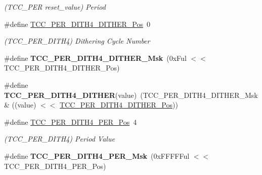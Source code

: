 \begin{DoxyCompactItemize}
\begin{DoxyCompactList}\small\item\em (T\+C\+C\+\_\+\+P\+E\+R reset\+\_\+value) Period \end{DoxyCompactList}\item 
\hypertarget{group___s_a_m_l21___t_c_c_ga9c229609a7a06a64228b8e317d126b72}{}\#define \hyperlink{group___s_a_m_l21___t_c_c_ga9c229609a7a06a64228b8e317d126b72}{T\+C\+C\+\_\+\+P\+E\+R\+\_\+\+D\+I\+T\+H4\+\_\+\+D\+I\+T\+H\+E\+R\+\_\+\+Pos}~0\label{group___s_a_m_l21___t_c_c_ga9c229609a7a06a64228b8e317d126b72}

\begin{DoxyCompactList}\small\item\em (T\+C\+C\+\_\+\+P\+E\+R\+\_\+\+D\+I\+T\+H4) Dithering Cycle Number \end{DoxyCompactList}\item 
\hypertarget{group___s_a_m_l21___t_c_c_gae3246669a1f05e63ea350d9879012d2a}{}\#define {\bfseries T\+C\+C\+\_\+\+P\+E\+R\+\_\+\+D\+I\+T\+H4\+\_\+\+D\+I\+T\+H\+E\+R\+\_\+\+Msk}~(0x\+Ful $<$$<$ T\+C\+C\+\_\+\+P\+E\+R\+\_\+\+D\+I\+T\+H4\+\_\+\+D\+I\+T\+H\+E\+R\+\_\+\+Pos)\label{group___s_a_m_l21___t_c_c_gae3246669a1f05e63ea350d9879012d2a}

\item 
\hypertarget{group___s_a_m_l21___t_c_c_ga7735c1ab8d58c6a4c77527fa9f6d36e2}{}\#define {\bfseries T\+C\+C\+\_\+\+P\+E\+R\+\_\+\+D\+I\+T\+H4\+\_\+\+D\+I\+T\+H\+E\+R}(value)~(T\+C\+C\+\_\+\+P\+E\+R\+\_\+\+D\+I\+T\+H4\+\_\+\+D\+I\+T\+H\+E\+R\+\_\+\+Msk \& ((value) $<$$<$ \hyperlink{group___s_a_m_l21___t_c_c_ga9c229609a7a06a64228b8e317d126b72}{T\+C\+C\+\_\+\+P\+E\+R\+\_\+\+D\+I\+T\+H4\+\_\+\+D\+I\+T\+H\+E\+R\+\_\+\+Pos}))\label{group___s_a_m_l21___t_c_c_ga7735c1ab8d58c6a4c77527fa9f6d36e2}

\item 
\hypertarget{group___s_a_m_l21___t_c_c_ga0199ba19718807ae1fb73141bea0243e}{}\#define \hyperlink{group___s_a_m_l21___t_c_c_ga0199ba19718807ae1fb73141bea0243e}{T\+C\+C\+\_\+\+P\+E\+R\+\_\+\+D\+I\+T\+H4\+\_\+\+P\+E\+R\+\_\+\+Pos}~4\label{group___s_a_m_l21___t_c_c_ga0199ba19718807ae1fb73141bea0243e}

\begin{DoxyCompactList}\small\item\em (T\+C\+C\+\_\+\+P\+E\+R\+\_\+\+D\+I\+T\+H4) Period Value \end{DoxyCompactList}\item 
\hypertarget{group___s_a_m_l21___t_c_c_gaaefa6da70f4fef24e82da53cfc35dde8}{}\#define {\bfseries T\+C\+C\+\_\+\+P\+E\+R\+\_\+\+D\+I\+T\+H4\+\_\+\+P\+E\+R\+\_\+\+Msk}~(0x\+F\+F\+F\+F\+Ful $<$$<$ T\+C\+C\+\_\+\+P\+E\+R\+\_\+\+D\+I\+T\+H4\+\_\+\+P\+E\+R\+\_\+\+Pos)\label{group___s_a_m_l21___t_c_c_gaaefa6da70f4fef24e82da53cfc35dde8}


\end{DoxyCompactItemize}
